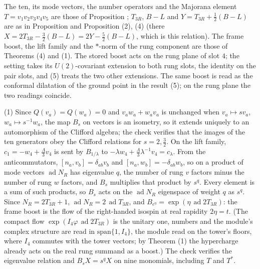 The ten, its mode vectors, the number operators and the Majorana element $T = v_{1}v_{2}v_{3}v_{4}v_{5}$ are those of Proposition ; $T_{3R}$, $B - L$ and $Y = T_{3R} + \tfrac12(B - L)$ are as in Proposition  and Proposition (2), (4) (there $X = 2T_{3R} - \tfrac32(B - L) = 2Y - \tfrac52(B - L)$, which is this relation). The frame boost, the lift family and the $*$-norm of the rung component are those of Theorems (4) and (1). The stored boost acts on the rung plane of slot $4$; the setting takes its $U(2)$-covariant extension to both rung slots, the identity on the pair slots, and (5) treats the two other extensions. The same boost is read as the conformal dilatation of the ground point in the result (5); on the rung plane the two readings coincide.

(1) Since $Q(v_{a}) = Q(w_{a}) = 0$ and $v_{a}w_{a} + w_{a}v_{a}$ is unchanged when $v_{a} \mapsto sv_{a}$, $w_{a} \mapsto s^{-1}w_{a}$, the map $B_{s}$ on vectors is an isometry, so it extends uniquely to an automorphism of the Clifford algebra; the check verifies that the images of the ten generators obey the Clifford relations for $s = 2, \tfrac32$. On the lift family, $c_{1} = -w_{4} + \tfrac{\Lambda}{3}v_{4}$ is sent by $B_{1/\lambda}$ to $-\lambda w_{4} + \tfrac{\Lambda}{3}\lambda^{-1}v_{4} = c_{\lambda}$. From the anticommutators, $[n_{a}, v_{b}] = \delta_{ab}v_{b}$ and $[n_{a}, w_{b}] = -\delta_{ab}w_{b}$, so on a product of mode vectors $\operatorname{ad} N_{R}$ has eigenvalue $q$, the number of rung $v$ factors minus the number of rung $w$ factors, and $B_{s}$ multiplies that product by $s^{q}$. Every element is a sum of such products, so $B_{s}$ acts on the $\operatorname{ad} N_{R}$ eigenspace of weight $q$ as $s^{q}$. Since $N_{R} = 2T_{3R} + 1$, $\operatorname{ad} N_{R} = 2\,\operatorname{ad} T_{3R}$, and $B_{e^{\eta}} = \exp(\eta\,\operatorname{ad} 2T_{3R})$: the frame boost is the flow of the right-handed isospin at real rapidity $2\eta = t$. (The compact flow $\exp(I_{4}\varphi\,\operatorname{ad} 2T_{3R})$ is the unitary one, numbers and the module's complex structure are read in $\mathrm{span}\{1, I_{4}\}$, the module read on the tower's floors, where $I_{4}$ commutes with the tower vectors; by Theorem (1) the hypercharge already acts on the real rung summand as a boost.) The check verifies the eigenvalue relation and $B_{s}X = s^{q}X$ on nine monomials, including $T$ and $T^{*}$.


